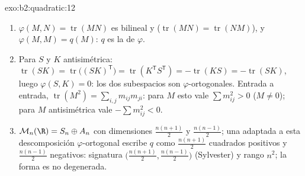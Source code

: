 \begin{solution}{exo:b2:quadratic:12}
\begin{enumerate}
  \item $\varphi(M, N) = \operatorname{tr}(MN)$ es bilineal y
         ($\operatorname{tr}(MN) =
        \operatorname{tr}(NM)$), y $\varphi(M, M) = q(M)$: $q$ es la
         de $\varphi$.
  \item Para $S$  y $K$ antisimétrica:
        $\operatorname{tr}(SK) =
        \operatorname{tr}\bigl((SK)^{\mathsf T}\bigr) =
        \operatorname{tr}(K^{\mathsf T}S^{\mathsf T}) =
        -\operatorname{tr}(KS) = -\operatorname{tr}(SK)$, luego
        $\varphi(S, K) = 0$: los dos subespacios son
        $\varphi$-ortogonales. Entrada a entrada,
        $\operatorname{tr}(M^2) = \sum_{i,j} m_{ij}m_{ji}$: para $M$
         esto vale $\sum m_{ij}^2 > 0$ ($M \neq 0$); para
        $M$ antisimétrica vale $-\sum m_{ij}^2 < 0$.
  \item $\mathcal M_n(\R) = S_n \oplus A_n$ con dimensiones
        $\frac{n(n+1)}2$ y $\frac{n(n-1)}2$; una
         adaptada a esta descomposición
        $\varphi$-ortogonal escribe $q$ como $\frac{n(n+1)}2$
        cuadrados positivos y $\frac{n(n-1)}2$ negativos: signatura
        $\bigl(\frac{n(n+1)}2, \frac{n(n-1)}2\bigr)$ (Sylvester) y
        rango $n^2$; la forma es no degenerada.
\end{enumerate}
\end{solution}

